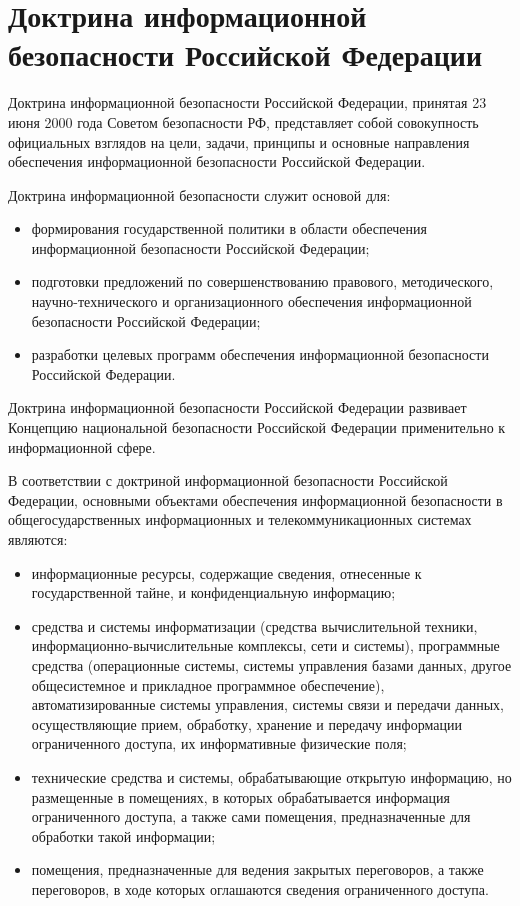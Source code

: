 \section{Доктрина информационной безопасности Российской Федерации} \label{rights_doctrine}

Доктрина информационной безопасности Российской Федерации, принятая 23 июня 2000 года Советом безопасности РФ, представляет собой совокупность официальных взглядов на цели, задачи, принципы и основные направления обеспечения информационной безопасности Российской Федерации.

\vspace{\baselineskip}
Доктрина информационной безопасности служит основой для:
\begin{itemize}
	\item формирования государственной политики в области обеспечения информационной безопасности Российской Федерации; 
	\item подготовки предложений по совершенствованию правового, методического, научно-технического и организационного обеспечения информационной безопасности Российской Федерации; 
	\item разработки целевых программ обеспечения информационной безопасности Российской Федерации. 
\end{itemize}

Доктрина информационной безопасности Российской Федерации развивает Концепцию национальной безопасности Российской Федерации применительно к информационной сфере.

\vspace{\baselineskip}
В соответствии с доктриной информационной безопасности Российской Федерации, основными объектами обеспечения информационной безопасности в общегосударственных информационных и телекоммуникационных системах являются:
\begin{itemize}
	\item информационные ресурсы, содержащие сведения, отнесенные к государственной тайне, и конфиденциальную информацию;
	\item средства и системы информатизации (средства вычислительной техники, информационно-вычислительные комплексы, сети и системы), программные средства (операционные системы, системы управления базами данных, другое общесистемное и прикладное программное обеспечение), автоматизированные системы управления, системы связи и передачи данных, осуществляющие прием, обработку, хранение и передачу информации ограниченного доступа, их информативные физические поля;
	\item технические средства и системы, обрабатывающие открытую информацию, но размещенные в помещениях, в которых обрабатывается информация ограниченного доступа, а также сами помещения, предназначенные для обработки такой информации;
	\item помещения, предназначенные для ведения закрытых переговоров, а также переговоров, в ходе которых оглашаются сведения ограниченного доступа.
\end{itemize}

